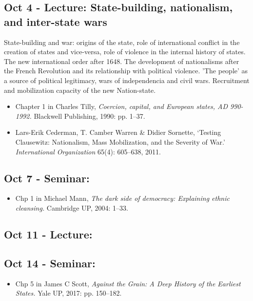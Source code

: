 \documentclass[12pt, a4paper]{article}
\begin{document}
\subsection*{Oct 4 - Lecture: State-building, nationalism, and inter-state wars}

State-building and war: origins of the state, role of international conflict in the creation of states and vice-versa, role of violence in the internal history of states. The new international order after 1648. The development of nationalisms after the French Revolution and its relationship with political violence. 'The people' as a source of political legitimacy, wars of independencia and civil wars. Recruitment and mobilization capacity of the new Nation-state.

\begin{itemize}
\setlength\itemsep{0pt}
\item Chapter 1 in Charles Tilly, \textit{Coercion, capital, and European states, AD 990-1992.} Blackwell Publishing, 1990: pp. 1--37.
\item Lars-Erik Cederman, T. Camber Warren \& Didier Sornette, `Testing Clausewitz: Nationalism, Mass Mobilization, and the Severity of War.' \textit{International Organization} 65(4): 605--638, 2011.
\end{itemize}

\subsection*{Oct 7 - Seminar:}

\begin{itemize}
\setlength\itemsep{0pt}
\item Chp 1 in Michael Mann, \textit{The dark side of democracy: Explaining ethnic cleansing.} Cambridge UP, 2004: 1--33.
\end{itemize}

\subsection*{Oct 11 - Lecture: {\color{red}{No class}}}

\subsection*{Oct 14 - Seminar:}

\begin{itemize}
\setlength\itemsep{0pt}
\item Chp 5 in James C Scott, \textit{Against the Grain: A Deep History of the Earliest States.} Yale UP, 2017: pp. 150--182.
\end{itemize}
\end{document}
